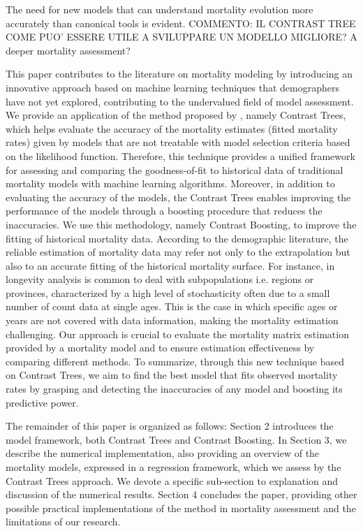 \documentclass[fleqn,10pt]{wlscirep}
\begin{document}
\color{red}The need for new models that can understand mortality evolution more accurately than canonical tools is evident. COMMENTO: IL CONTRAST TREE COME PUO' ESSERE UTILE A SVILUPPARE UN MODELLO MIGLIORE? A deeper mortality assessment? \color{black}

This paper contributes to the literature on mortality modeling by introducing an innovative approach based on machine learning techniques that demographers have not yet explored, contributing to the undervalued field of model assessment. 
\color{blue}
We provide an application of the method proposed by \cite{Friedman2020}, namely Contrast Trees, which helps evaluate the accuracy of the mortality estimates (fitted mortality rates) given by models that are not treatable with model selection criteria based on the likelihood function. Therefore, this technique provides a unified framework for assessing and comparing the goodness-of-fit to historical data of traditional mortality models with machine learning algorithms.
\color{black}
Moreover, in addition to evaluating the accuracy of the models, the Contrast Trees enables improving the performance of the models through a boosting procedure that reduces the inaccuracies. We use this methodology, namely Contrast Boosting, to improve \color{blue}the fitting of historical mortality data.
According to the demographic literature, the reliable estimation of mortality data may refer not only to the extrapolation but also to an accurate fitting of the historical mortality surface. For instance, in longevity analysis is common to deal with subpopulations i.e. regions or provinces, characterized by a high level of stochasticity often due to a small number of count data at single ages. This is the case in which specific ages or years are not covered with data information, making the mortality estimation challenging. Our approach is crucial to evaluate the mortality matrix estimation provided by a mortality model and to ensure estimation effectiveness by comparing different methods.
To summarize, through this new technique based on Contrast Trees, we aim to find the best model that fits observed mortality rates by grasping and detecting the inaccuracies of any model and boosting its predictive power. \color{black}

The remainder of this paper is organized as follows: Section 2 introduces the model framework, both Contrast Trees and Contrast Boosting. 
In Section 3, we describe the numerical implementation, also providing an overview of the mortality models, expressed in a regression framework, which we assess by the Contrast Trees approach. We devote a specific sub-section to explanation and discussion of the numerical results. 
Section 4 concludes the paper, providing other possible practical implementations of the method in mortality assessment and the limitations of our research.
\end{document}
